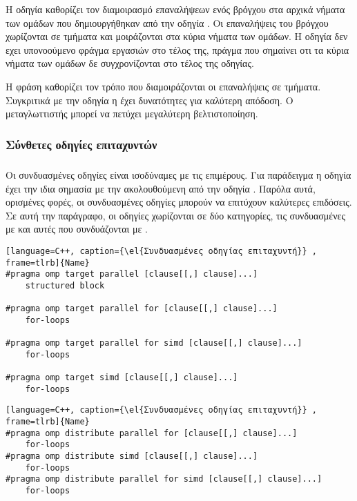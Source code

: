 Η οδηγία  \emph{} καθορίζει τον διαμοιρασμό  επαναλήψεων ενός βρόγχου στα αρχικά νήματα των ομάδων που δημιουργήθηκαν από την οδηγία \emph{}. Οι επαναλήψεις του βρόγχου χωρίζονται σε τμήματα και μοιράζονται στα κύρια νήματα των ομάδων. Η οδηγία \emph{} δεν εχει υπονοούμενο φράγμα εργασιών στο τέλος της, πράγμα που σημαίνει οτι τα κύρια νήματα των ομάδων δε συγχρονίζονται στο τέλος της οδηγίας.

Η φράση \emph{} καθορίζει τον τρόπο που διαμοιράζονται οι επαναλήψεις σε τμήματα. Συγκριτικά με την οδηγία \emph{} η \emph{} έχει δυνατότητες για καλύτερη απόδοση. Ο μεταγλωττιστής μπορεί να πετύχει μεγαλύτερη βελτιστοποίηση.



\subsubsection{Σύνθετες οδηγίες επιταχυντών}
\subparagraph{}

Οι συνδυασμένες οδηγίες είναι ισοδύναμες με τις επιμέρους. Για παράδειγμα η οδηγία \emph{} έχει την ιδια σημασία με την \emph{} ακολουθούμενη από την οδηγία \emph{}. Παρόλα αυτά, ορισμένες φορές, οι συνδυασμένες οδηγίες μπορούν να επιτύχουν καλύτερες επιδόσεις.
Σε αυτή την παράγραφο, οι οδηγίες χωρίζονται σε δύο κατηγορίες, τις συνδυασμένες με \emph{} και αυτές που συνδυάζονται με \emph{}.

\begin{lstlisting}[language=C++, caption={\el{Συνδυασμένες οδηγίας επιταχυντή}} , frame=tlrb]{Name}
#pragma omp target parallel [clause[[,] clause]...]
	structured block

#pragma omp target parallel for [clause[[,] clause]...]
	for-loops
	
#pragma omp target parallel for simd [clause[[,] clause]...]
	for-loops
	
#pragma omp target simd [clause[[,] clause]...]
	for-loops
\end{lstlisting}


\begin{lstlisting}[language=C++, caption={\el{Συνδυασμένες οδηγίας επιταχυντή}} , frame=tlrb]{Name}
#pragma omp distribute parallel for [clause[[,] clause]...]
	for-loops
#pragma omp distribute simd [clause[[,] clause]...]
	for-loops
#pragma omp distribute parallel for simd [clause[[,] clause]...]
	for-loops
\end{lstlisting}


